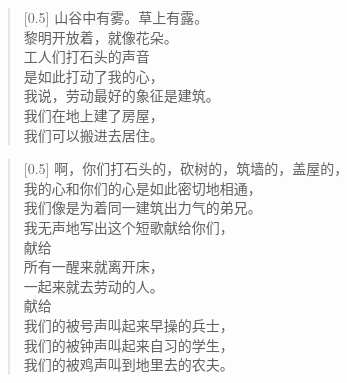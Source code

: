 \documentclass[12pt,UTF-8,openany]{ctexbook}
\begin{document}
\begin{normalsize}
    
    \begin{verse}[0.5\linewidth]
        山谷中有雾。草上有露。 \\
        黎明开放着，就像花朵。 \\
        工人们打石头的声音 \\
        是如此打动了我的心， \\
        我说，劳动最好的象征是建筑。 \\
        我们在地上建了房屋， \\
        我们可以搬进去居住。
    \end{verse}
    
    
    \begin{verse}[0.5\linewidth]
        啊，你们打石头的，砍树的，筑墙的，盖屋的， \\
        我的心和你们的心是如此密切地相通， \\
        我们像是为着同一建筑出力气的弟兄。 \\
        我无声地写出这个短歌献给你们， \\
        献给 \\
        所有一醒来就离开床， \\
        一起来就去劳动的人。 \\
        献给 \\
        我们的被号声叫起来早操的兵士， \\
        我们的被钟声叫起来自习的学生， \\
        我们的被鸡声叫到地里去的农夫。
    \end{verse}
    
\end{normalsize}
\end{document}
